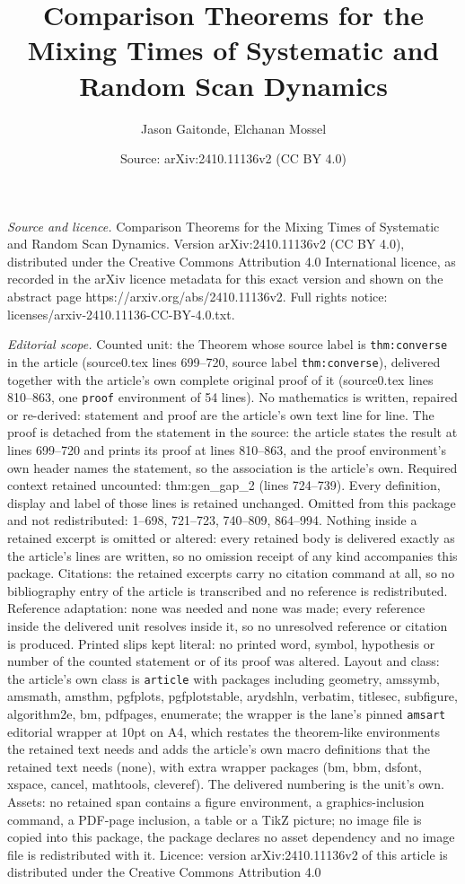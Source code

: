 \documentclass[10pt,a4paper]{amsart}
\title[Comparison Theorems for the Mixing Times of Systematic and R]{Comparison Theorems for the Mixing Times of Systematic and Random Scan Dynamics}
\author{Jason Gaitonde, Elchanan Mossel}
\date{Source: arXiv:2410.11136v2 (CC BY 4.0)}
\begin{document}
\maketitle

\noindent\emph{Source and licence.} Comparison Theorems for the Mixing Times of Systematic and Random Scan Dynamics. Version arXiv:2410.11136v2 (CC BY 4.0), distributed under the Creative Commons Attribution 4.0 International licence, as recorded in the arXiv licence metadata for this exact version and shown on the abstract page https://arxiv.org/abs/2410.11136v2. Full rights notice: licenses/arxiv-2410.11136-CC-BY-4.0.txt.\par\smallskip

\noindent\textit{Editorial scope.} Counted unit: the Theorem whose source label is \texttt{thm:converse} in the article (source0.tex lines 699--720, source label \texttt{thm:converse}), delivered together with the article's own complete original proof of it (source0.tex lines 810--863, one \texttt{proof} environment of 54 lines). No mathematics is written, repaired or re-derived: statement and proof are the article's own text line for line. The proof is detached from the statement in the source: the article states the result at lines 699--720 and prints its proof at lines 810--863, and the proof environment's own header names the statement, so the association is the article's own. Required context retained uncounted: thm:gen\_gap\_2 (lines 724--739). Every definition, display and label of those lines is retained unchanged. Omitted from this package and not redistributed: 1--698, 721--723, 740--809, 864--994. Nothing inside a retained excerpt is omitted or altered: every retained body is delivered exactly as the article's lines are written, so no omission receipt of any kind accompanies this package. Citations: the retained excerpts carry no citation command at all, so no bibliography entry of the article is transcribed and no reference is redistributed. Reference adaptation: none was needed and none was made; every reference inside the delivered unit resolves inside it, so no unresolved reference or citation is produced. Printed slips kept literal: no printed word, symbol, hypothesis or number of the counted statement or of its proof was altered. Layout and class: the article's own class is \texttt{article} with packages including geometry, amssymb, amsmath, amsthm, pgfplots, pgfplotstable, arydshln, verbatim, titlesec, subfigure, algorithm2e, bm, pdfpages, enumerate; the wrapper is the lane's pinned \texttt{amsart} editorial wrapper at 10pt on A4, which restates the theorem-like environments the retained text needs and adds the article's own macro definitions that the retained text needs (none), with extra wrapper packages (bm, bbm, dsfont, xspace, cancel, mathtools, cleveref). The delivered numbering is the unit's own. Assets: no retained span contains a figure environment, a graphics-inclusion command, a PDF-page inclusion, a table or a TikZ picture; no image file is copied into this package, the package declares no asset dependency and no image file is redistributed with it. Licence: version arXiv:2410.11136v2 of this article is distributed under the Creative Commons Attribution 4.0 
\end{document}
